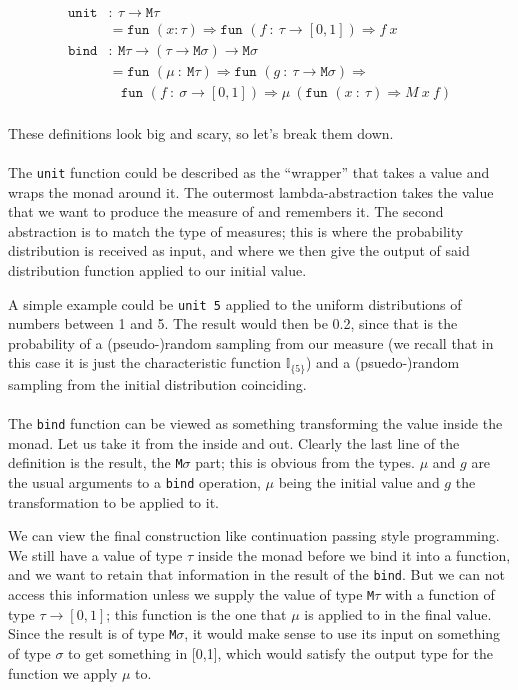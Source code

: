 \documentclass[11pt, leqno, titlepage]{article}
\theoremstyle{definition}
\begin{document}
\begin{align*}
  \texttt{unit} & :~ \tau\to\texttt{M}\tau\\
                & = \texttt{fun }(x:\tau)\Rightarrow
                  \texttt{fun }(f~:~\tau\to[0,1])\Rightarrow f~x\\
  \texttt{bind} & :~\texttt{M}\tau\to(\tau\to\texttt{M}\sigma)\to\texttt{M}\sigma\\
                & = \texttt{fun }(\mu~:~\texttt{M}\tau)\Rightarrow \texttt{fun }
                  (g~:~\tau\to\texttt{M}\sigma) \Rightarrow\\
                & ~~~~\texttt{fun }(f~:~\sigma\to[0,1])\Rightarrow \mu~ (\texttt{fun
                  }(x~:~\tau)\Rightarrow M~x~f)
\end{align*}
\\
These definitions look big and scary, so let's break them down.
\\ \\
The \texttt{unit} function could be described as the ``wrapper'' that takes a value
and wraps the monad around it. The outermost lambda-abstraction takes the value that
we want to produce the measure of and remembers it. The second abstraction is to
match the type of measures; this is where the probability distribution is received as
input, and where we then give the output of said distribution function applied to our
initial value.

A simple example could be \texttt{unit 5} applied to the uniform distributions of
numbers between 1 and 5. The result would then be 0.2, since that is the probability
of a (pseudo-)random sampling from our measure (we recall that in this case it is
just the characteristic function $\mathbb{I}_{\{5\}}$) and a (psuedo-)random sampling
from the initial distribution coinciding. 
\\ \\
The \texttt{bind} function can be viewed as something transforming the value inside
the monad. 
Let us take it from the inside and out. Clearly the last line of the definition is
the result, the \texttt{M}$\sigma$ part; this is obvious from the types. $\mu$ and
$g$ are the usual arguments to a \texttt{bind} operation, $\mu$ being the initial
value and $g$ the transformation to be applied to it.

We can view the final construction like continuation passing style programming. We
still have a value of type $\tau$ inside the monad before we bind it into a function,
and we want to retain that information in the result of the \texttt{bind}. But we can
not access this information unless we supply the value of type \texttt{M}$\tau$ with
a function of type $\tau \to [0,1]$; this function is the one that $\mu$ is applied
to in the final value. Since the result is of type \texttt{M}$\sigma$, it would make
sense to use its input on something of type $\sigma$ to get something in [0,1], which
would satisfy the output type for the function we apply $\mu$ to.
\end{document}
